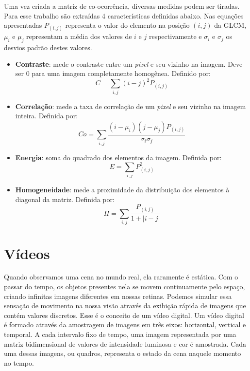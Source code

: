 Uma vez criada a matriz de co-ocorrência, diversas medidas podem ser tiradas. Para esse trabalho são extraídas 4 características definidas abaixo. Nas equações apresentadas $P_{(i,j)}$ representa o valor do elemento na posição $(i,j)$ da GLCM, $\mu_i$ e $\mu_j$ representam a média dos valores de $i$ e $j$ respectivamente e $\sigma_i$ e $\sigma_j$ os desvios padrão destes valores.

\begin{itemize}

\item \textbf{Contraste}: mede o contraste entre um \textit{pixel} e seu vizinho na imagem. Deve ser 0 para uma imagem completamente homogênea. Definido por:
	\begin{equation}
		C = \sum_{i,j} (i-j)^{2}P_{(i,j)}
	\end{equation}
	
\item \textbf{Correlação}: mede a taxa de correlação de um \textit{pixel} e seu vizinho na imagem inteira. Definida por:
	\begin{equation}
		Co = \sum_{i,j} \frac{(i - \mu_i)(j - \mu_j)P_{(i,j)}}{\sigma_i\sigma_j}
	\end{equation}
	
\item \textbf{Energia}: soma do quadrado dos elementos da imagem. Definida por:
	\begin{equation}
		E = \sum_{i,j} P_{(i,j)}^{2}
	\end{equation}
	
\item \textbf{Homogeneidade}: mede a proximidade da distribuição dos elementos à diagonal da matriz. Definida por:
	\begin{equation}
		H = \sum_{i,j} \frac{P_{(i,j)}}{1+|i-j|}
	\end{equation}
\end{itemize}


\section{Vídeos}\label{sec:video}


Quando observamos uma cena no mundo real, ela raramente é estática. Com o passar do tempo, os objetos presentes nela se movem continuamente pelo espaço, criando infinitas imagens diferentes em nossas retinas. Podemos simular essa sensação de movimento na nossa visão através da exibição rápida de imagens que contém valores discretos. Esse é o conceito de um vídeo digital. Um vídeo digital é formado através da amostragem de imagens	em três eixos: horizontal, vertical e temporal\cite{LivroVideoDigital}. A cada intervalo fixo de tempo, uma imagem representada por uma matriz bidimensional de valores de intensidade luminosa e cor é amostrada. Cada uma dessas imagens, ou quadros, representa o estado da cena naquele momento no tempo.

